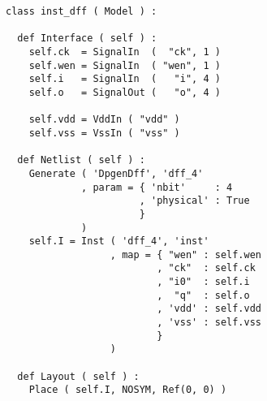 \begin{itemize}
\begin{verbatim}
class inst_dff ( Model ) :

  def Interface ( self ) :
    self.ck  = SignalIn  (  "ck", 1 )
    self.wen = SignalIn  ( "wen", 1 )
    self.i   = SignalIn  (   "i", 4 )
    self.o   = SignalOut (   "o", 4 )

    self.vdd = VddIn ( "vdd" )
    self.vss = VssIn ( "vss" )
    
  def Netlist ( self ) :
    Generate ( 'DpgenDff', 'dff_4'
             , param = { 'nbit'     : 4
                       , 'physical' : True
                       }
             )      
    self.I = Inst ( 'dff_4', 'inst'
                  , map = { "wen" : self.wen
                          , "ck"  : self.ck
                          , "i0"  : self.i
                          ,  "q"  : self.o
                          , 'vdd' : self.vdd
                          , 'vss' : self.vss
                          }
                  )
    
  def Layout ( self ) :
    Place ( self.I, NOSYM, Ref(0, 0) )
\end{verbatim}
\end{itemize}
